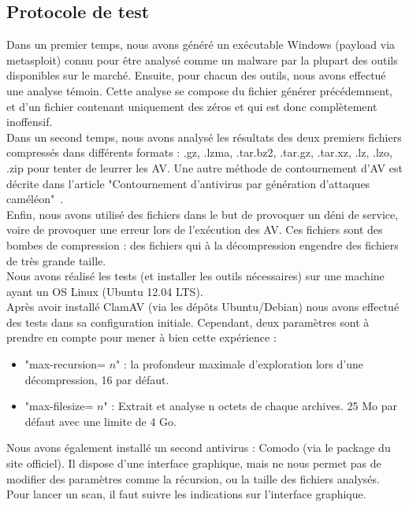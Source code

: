 \documentclass[smallextended]{svjour3}       %
\begin{document}
\subsection{Protocole de test}
\label{3.1Protocole}
Dans un premier temps, nous avons généré un exécutable Windows (payload via metasploit) connu pour être analysé comme un malware par la plupart des outils disponibles sur le marché. Ensuite, pour chacun des outils, nous avons effectué une analyse témoin. Cette analyse se compose du fichier générer précédemment, et d'un fichier contenant uniquement des zéros et qui est donc complètement inoffensif.\\
Dans un second temps, nous avons analysé les résultats des deux premiers fichiers compressés dans différents formats : .gz, .lzma, .tar.bz2, .tar.gz, .tar.xz, .lz, .lzo, .zip pour tenter de leurrer les AV. Une autre méthode de contournement d'AV est décrite dans l'article "Contournement d'antivirus par génération d'attaques caméléon"~\cite{Contournement}.\\
Enfin, nous avons utilisé des fichiers dans le but de provoquer un déni de service, voire de provoquer une erreur lors de l'exécution des AV. Ces fichiers sont des bombes de compression : des fichiers qui à la décompression engendre des fichiers de très grande taille.\\
$ $\\
Nous avons réalisé les tests (et installer les outils nécessaires) sur une machine ayant un OS Linux (Ubuntu 12.04 LTS).\\
Après avoir installé ClamAV (via les dépôts Ubuntu/Debian) nous avons effectué des tests dans sa configuration initiale. Cependant, deux paramètres sont à prendre en compte pour mener à bien cette expérience :
\begin{itemize}
\item "max-recursion= $n$" : la profondeur maximale d'exploration lors d'une décompression, 16 par défaut.
\item "max-filesize= $n$" : Extrait et analyse  n octets de chaque archives. 25 Mo par défaut avec une limite de 4 Go.
\end{itemize}
$ $\\
Nous avons également installé un second antivirus : Comodo (via le package du site officiel). Il dispose d'une interface graphique, mais ne nous permet pas de modifier des paramètres comme la récursion, ou la taille des fichiers analysés. Pour lancer un scan, il faut suivre les indications sur l'interface graphique.\\
\end{document}
